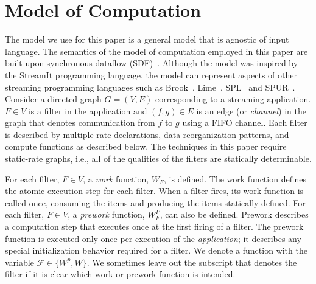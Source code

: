 \section{Model of Computation}
\label{model}

The model we use for this paper is a general model that is agnostic of
input language.  The semantics of the model of computation employed in
this paper are built upon synchronous dataflow (SDF)~\cite{leeSDF}.
Although the model was inspired by the StreamIt programming language,
the model can represent aspects of other streaming programming
languages such as Brook~\cite{brook04}, Lime~\cite{lime10},
SPL~\cite{spl09} and SPUR~\cite{spur05samos}.  Consider a directed
graph $G = (V, E)$ corresponding to a streaming application. $F \in V$
is a filter in the application and $(f, g) \in E$ is an edge (or {\it
  channel}) in the graph that denotes communication from $f$ to $g$
using a FIFO channel.  Each filter is described by multiple rate
declarations, data reorganization patterns, and compute functions as
described below. The techniques in this paper require static-rate
graphs, i.e., all of the qualities of the filters are statically
determinable.



For each filter, $F \in V$, a {\it work} function, $W_F$, is defined.
The work function defines the atomic execution step for each filter.
When a filter fires, its work function is called once, consuming the
items and producing the items statically defined.  For each filter, $F
\in V$, a {\it prework} function, $W_F^P$, can also be defined.
Prework describes a computation step that executes once at the first
firing of a filter.  The prework function is executed only once per
execution of the {\it application}; it describes any special
initialization behavior required for a filter. We denote a function
with the variable $\mathcal{F} \in \{W^p, W\}$.  We sometimes leave
out the subscript that denotes the filter if it is clear which work or
prework function is intended.

